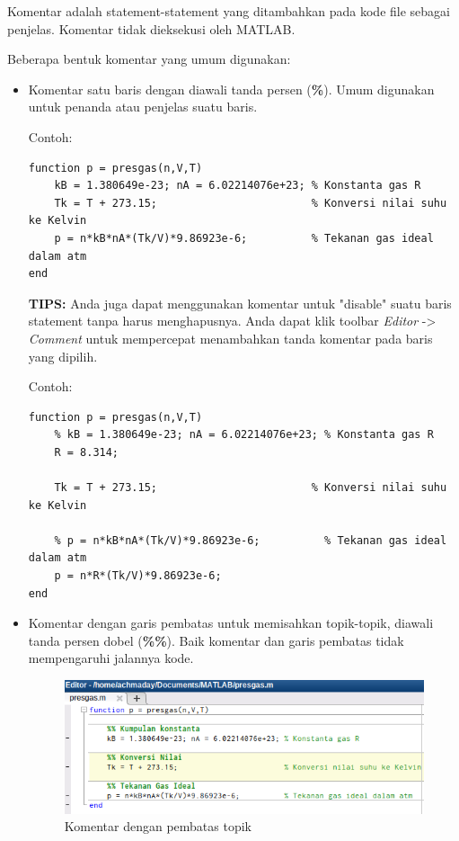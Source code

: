 \documentclass[12pt]{book}
\begin{document}
	Komentar adalah statement-statement yang ditambahkan pada kode file sebagai penjelas.
	Komentar tidak dieksekusi oleh MATLAB.
	
	Beberapa bentuk komentar yang umum digunakan:
	\begin{itemize}
		\item Komentar satu baris dengan diawali tanda persen (\textbf{\%}).
		Umum digunakan untuk penanda atau penjelas suatu baris.
		
		Contoh:
		\begin{verbatim}
function p = presgas(n,V,T)
	kB = 1.380649e-23; nA = 6.02214076e+23; % Konstanta gas R
	Tk = T + 273.15;                        % Konversi nilai suhu ke Kelvin
	p = n*kB*nA*(Tk/V)*9.86923e-6;          % Tekanan gas ideal dalam atm
end
		\end{verbatim}
	
		\textbf{TIPS:} Anda juga dapat menggunakan komentar untuk "disable" suatu baris statement tanpa harus menghapusnya.
		Anda dapat klik toolbar \textit{Editor} -> \textit{Comment} untuk mempercepat menambahkan tanda komentar pada baris yang dipilih.
		
		Contoh:
		\begin{verbatim}
function p = presgas(n,V,T)
	% kB = 1.380649e-23; nA = 6.02214076e+23; % Konstanta gas R
	R = 8.314;
	
	Tk = T + 273.15;                        % Konversi nilai suhu ke Kelvin
	
	% p = n*kB*nA*(Tk/V)*9.86923e-6;          % Tekanan gas ideal dalam atm
	p = n*R*(Tk/V)*9.86923e-6;
end
		\end{verbatim}
		\item Komentar dengan garis pembatas untuk memisahkan topik-topik, diawali tanda persen dobel (\textbf{\%\%}).
		Baik komentar dan garis pembatas tidak mempengaruhi jalannya kode.
		
		\begin{figure}[!ht]
			\centering
			\includegraphics[width=400pt]{images/komentopik}
			\caption{Komentar dengan pembatas topik}
		\end{figure}
	\end{itemize}
	
\end{document}
